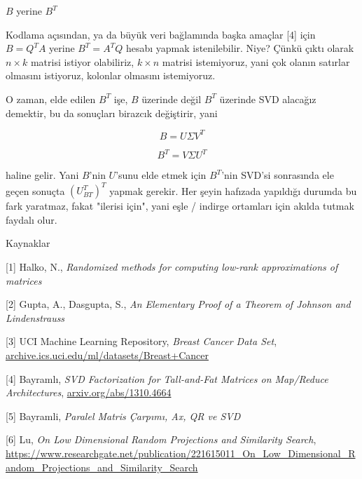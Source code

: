 \documentclass[12pt,fleqn]{article}\usepackage{../../common}
\begin{document}
$B$ yerine $B^T$

Kodlama açısından, ya da büyük veri bağlamında başka amaçlar [4] için
$B = Q^T A$ yerine $B^T = A^T Q$ hesabı yapmak istenilebilir. Niye?
Çünkü çıktı olarak $n \times k$ matrisi istiyor olabiliriz, $k \times
n$ matrisi istemiyoruz, yani çok olanın satırlar olmasını istiyoruz,
kolonlar olmasını istemiyoruz.

O zaman, elde edilen $B^T$ işe, $B$ üzerinde değil $B^T$ üzerinde SVD
alacağız demektir, bu da sonuçları birazcık değiştirir, yani

$$ B = U\Sigma V^T $$

$$ B^T = V\Sigma U^T $$

haline gelir. Yani $B$'nin $U$'sunu elde etmek için $B^T$'nin SVD'si
sonrasında ele geçen sonuçta $(U_{BT}^T)^T$ yapmak gerekir. Her şeyin
hafızada yapıldığı durumda bu fark yaratmaz, fakat "ilerisi için", yani
eşle / indirge ortamları için akılda tutmak faydalı olur.

Kaynaklar

[1] Halko, N., {\em Randomized methods for computing low-rank approximations of matrices}

[2] Gupta, A., Dasgupta, S., {\em An Elementary Proof of a Theorem of Johnson and Lindenstrauss}

[3] UCI Machine Learning Repository, 
    {\em Breast Cancer Data Set}, 
    \url{archive.ics.uci.edu/ml/datasets/Breast+Cancer}

[4] Bayramlı, {\em SVD Factorization for Tall-and-Fat Matrices on Map/Reduce Architectures}, 
    \url{arxiv.org/abs/1310.4664}

[5] Bayramli, {\em Paralel Matris Çarpımı, Ax, QR ve SVD} 

[6] Lu, {\em On Low Dimensional Random Projections and Similarity Search},
    \url{https://www.researchgate.net/publication/221615011_On_Low_Dimensional_Random_Projections_and_Similarity_Search}
\end{document}
